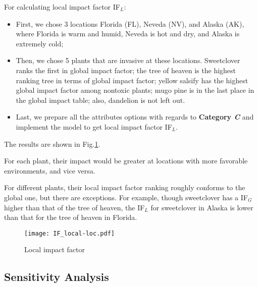 \documentclass[12pt]{article}
\begin{document}
		For calculating local impact factor IF$_L$:
		\vspace{-0.2cm}
		\begin{itemize}
		\item First, we chose 3 locations Florida (FL), Neveda (NV), and Alaska (AK), where Florida is warm and humid, Neveda is hot and dry, and Alaska is extremely cold;
		\vspace{-0.2cm}
		\item Then, we chose 5 plants that are invasive at these locations.  Sweetclover ranks the first in global impact factor; the tree of heaven is the highest ranking tree in terms of global impact factor; yellow salsify has the highest global impact factor among nontoxic plants; mugo pine is in the last place in the global impact table; also, dandelion is not left out.
		\vspace{-0.2cm}
		\item Last, we prepare all the attributes options with regards to \textbf{Category \textit{C}} and implement the model to get local impact factor IF$_L$.
		\end{itemize} 	
		
		The results are shown in Fig.\ref{fig:IFLocal}.  
		
		For each plant, their impact would be greater at locations with more favorable environments, and vice versa.
		
		For different plants, their local impact factor ranking roughly conforms to the global one, but there are exceptions.  For example, though sweetclover has a IF$_G$ higher than that of the tree of heaven, the IF$_L$ for sweetclover in Alaska is lower than that for the tree of heaven in Florida.
		
		\begin{figure}[htbp]
			\centering
			\texttt{[image: IF\_local-loc.pdf]}
			\caption{Local impact factor}
			\label{fig:IFLocal}
		\end{figure}

	\newpage
	
	\subsection{Sensitivity Analysis}
	
\end{document}
